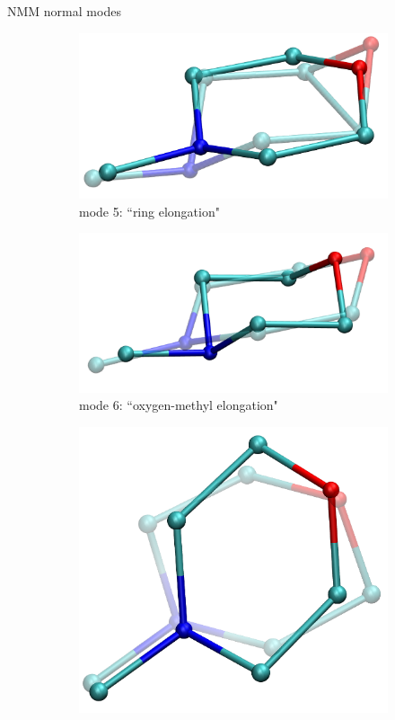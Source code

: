 \documentclass{beamer}
\begin{document}
\begin{frame}{NMM normal modes}
\begin{figure}
\begin{subfigure}{\x\textwidth}
			\includegraphics[width=\textwidth]{mode5_ot.png}
			\caption{mode 5: ``ring elongation"}
		\end{subfigure}				
		\begin{subfigure}{\x\textwidth}
			\includegraphics[width=\textwidth]{mode6_ot.png}
			\caption{mode 6: ``oxygen-methyl elongation"}
		\end{subfigure}
		\begin{subfigure}{\x\textwidth}
			\includegraphics[width=\textwidth]{mode7_ot.png}

\end{subfigure}
\end{figure}
\end{frame}
\end{document}
